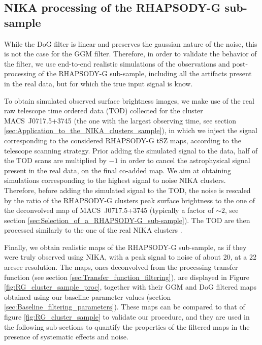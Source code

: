 \documentclass[twocolumn,traditabstract]{aa}
\begin{document}
\subsection{NIKA processing of the RHAPSODY-G sub-sample}
While the DoG filter is linear and preserves the gaussian nature of the noise, this is not the case for the GGM filter. Therefore, in order to validate the behavior of the filter, we use end-to-end realistic simulations of the observations and post-processing of the RHAPSODY-G sub-sample, including all the artifacts present in the real data, but for which the true input signal is know.

To obtain simulated observed surface brightness images, we make use of the real raw telescope time ordered data (TOD) collected for the cluster \mbox{MACS~J0717.5+3745} (the one with the largest observing time, see section \ref{sec:Application_to_the_NIKA_clusters_sample}), in which we inject the signal corresponding to the considered RHAPSODY-G tSZ maps, according to the telescope scanning strategy. Prior adding the simulated signal to the data, half of the TOD scans are multiplied by $-1$ in order to cancel the astrophysical signal present in the real data, on the final co-added map. We aim at obtaining simulations corresponding to the highest signal to noise NIKA clusters. Therefore, before adding the simulated signal to the TOD, the noise is rescaled by the ratio of the RHAPSODY-G clusters peak surface brightness to the one of the deconvolved map of \mbox{MACS~J0717.5+3745} (typically a factor of $\sim 2$, see section \ref{sec:Selection_of_a_RHAPSODY-G_sub-sample}). The TOD are then processed similarly to the one of the real NIKA clusters \citep[see][for more details]{Adam2015}. 

Finally, we obtain realistic maps of the RHAPSODY-G sub-sample, as if they were truly observed using NIKA, with a peak signal to noise of about 20, at a 22 arcsec resolution. The maps, ones deconvolved from the processing transfer function (see section \ref{sec:Transfer_function_filtering}), are displayed in Figure \ref{fig:RG_cluster_sample_proc}, together with their GGM and DoG filtered maps obtained using our baseline parameter values (section \ref{sec:Baseline_filtering_parameters}). These maps can be compared to that of figure \ref{fig:RG_cluster_sample} to validate our procedure, and they are used in the following sub-sections to quantify the properties of the filtered maps in the presence of systematic effects and noise.
\end{document}
